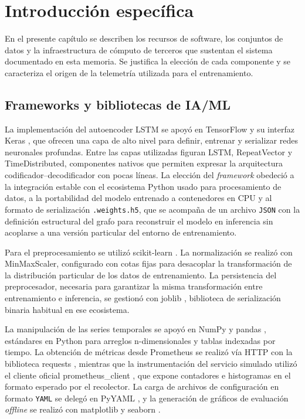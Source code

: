 
\chapter{Introducción específica}
\label{Chapter2}

En el presente capítulo se describen los recursos de software, los conjuntos de datos y la infraestructura de cómputo de terceros que sustentan el sistema documentado en esta memoria. Se justifica la elección de cada componente y se caracteriza el origen de la telemetría utilizada para el entrenamiento.

\section{Frameworks y bibliotecas de IA/ML}
\label{sec:frameworks-bibliotecas}

La implementación del autoencoder LSTM se apoyó en TensorFlow y su interfaz Keras \citep{abadi2016tensorflow, chollet2015keras}, que ofrecen una capa de alto nivel para definir, entrenar y serializar redes neuronales profundas. Entre las capas utilizadas figuran LSTM, RepeatVector y TimeDistributed, componentes nativos que permiten expresar la arquitectura codificador--decodificador con pocas líneas. La elección del \textit{framework} obedeció a la integración estable con el ecosistema Python usado para procesamiento de datos, a la portabilidad del modelo entrenado a contenedores en CPU y al formato de serialización \texttt{.weights.h5}, que se acompaña de un archivo \texttt{JSON} con la definición estructural del grafo para reconstruir el modelo en inferencia sin acoplarse a una versión particular del entorno de entrenamiento.

Para el preprocesamiento se utilizó scikit-learn \citep{pedregosa2011scikit}. La normalización se realizó con MinMaxScaler, configurado con cotas fijas para desacoplar la transformación de la distribución particular de los datos de entrenamiento. La persistencia del preprocesador, necesaria para garantizar la misma transformación entre entrenamiento e inferencia, se gestionó con joblib \citep{joblib_site}, biblioteca de serialización binaria habitual en ese ecosistema.

La manipulación de las series temporales se apoyó en NumPy \citep{harris2020numpy} y pandas \citep{mckinney2010pandas}, estándares en Python para arreglos n-dimensionales y tablas indexadas por tiempo. La obtención de métricas desde Prometheus se realizó vía HTTP con la biblioteca requests \citep{requests_site}, mientras que la instrumentación del servicio simulado utilizó el cliente oficial prometheus\_client \citep{prometheus_client_site}, que expone contadores e histogramas en el formato esperado por el recolector. La carga de archivos de configuración en formato \texttt{YAML} se delegó en PyYAML \citep{pyyaml_site}, y la generación de gráficos de evaluación \textit{offline} se realizó con matplotlib y seaborn \citep{matplotlib_site, seaborn_site}. 

